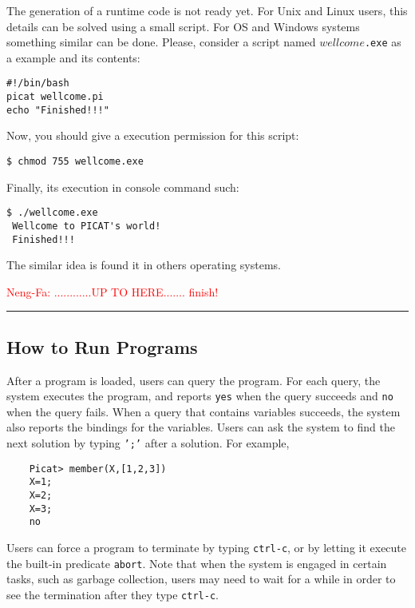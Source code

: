 The generation of a runtime code is not ready yet. For
Unix and Linux users, this details can be solved using
a small script. For OS and Windows systems something
similar can be done. Please, consider a script 
named \texttt{$wellcome$.exe} as a example and its contents:
\begin{verbatim}
#!/bin/bash          
picat wellcome.pi
echo "Finished!!!"
\end{verbatim}

Now, you should give a execution permission for this script:
\begin{verbatim}
$ chmod 755 wellcome.exe
\end{verbatim}

Finally, its execution in console command such:
\begin{verbatim}
$ ./wellcome.exe 
 Wellcome to PICAT's world! 
 Finished!!!

\end{verbatim}

The similar idea is found it in others operating systems.
 

\centering {\bf \textcolor{red}{{\rule{\paperwidth}{5pt}} }}

{\Huge \textcolor{red}{Neng-Fa: ............UP TO HERE....... finish!}}

{\bf \textcolor{red}{{\rule{\paperwidth}{5pt}} }}

\newpage


\subsection{How to Run Programs}
After a program is loaded, users can query the program. For each query, the system executes the program, and reports \texttt{yes} when the query succeeds and \texttt{no} when the query fails. When a query that contains variables succeeds, the system also reports the bindings for the variables. Users can ask the system to find the next solution by typing \texttt{';'} after a solution. For example,
\begin{verbatim}
    Picat> member(X,[1,2,3])
    X=1;
    X=2;
    X=3;
    no
\end{verbatim}
Users can force a program to terminate by typing \texttt{ctrl-c}, or by letting it execute the built-in predicate \texttt{abort}. Note that when the system is engaged in certain tasks, such as garbage collection, users may need to wait for a while in order to see the termination after they type \texttt{ctrl-c}.

